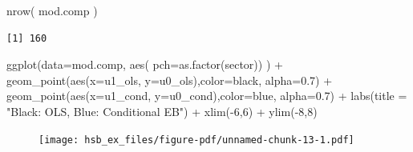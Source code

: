 \documentclass[
  letterpaper,
  DIV=11,
  numbers=noendperiod]{scrreprt}
\newenvironment{Shaded}{\begin{snugshade}}{\end{snugshade}}
\newcommand{\AttributeTok}[1]{\textcolor[rgb]{0.49,0.56,0.16}{#1}}
\newcommand{\DecValTok}[1]{\textcolor[rgb]{0.25,0.63,0.44}{#1}}
\newcommand{\FloatTok}[1]{\textcolor[rgb]{0.25,0.63,0.44}{#1}}
\newcommand{\FunctionTok}[1]{\textcolor[rgb]{0.02,0.16,0.49}{#1}}
\newcommand{\NormalTok}[1]{\textcolor[rgb]{0.00,0.44,0.13}{#1}}
\newcommand{\SpecialCharTok}[1]{\textcolor[rgb]{0.25,0.44,0.63}{#1}}
\newcommand{\StringTok}[1]{\textcolor[rgb]{0.25,0.44,0.63}{#1}}
\begin{document}
\begin{Shaded}
\begin{Highlighting}[]
\FunctionTok{nrow}\NormalTok{( mod.comp )}
\end{Highlighting}
\end{Shaded}

\begin{verbatim}
[1] 160
\end{verbatim}

\begin{Shaded}
\begin{Highlighting}[]
\FunctionTok{ggplot}\NormalTok{(}\AttributeTok{data=}\NormalTok{mod.comp, }\FunctionTok{aes}\NormalTok{( }\AttributeTok{pch=}\FunctionTok{as.factor}\NormalTok{(sector)) ) }\SpecialCharTok{+} 
         \FunctionTok{geom\_point}\NormalTok{(}\FunctionTok{aes}\NormalTok{(}\AttributeTok{x=}\NormalTok{u1\_ols, }\AttributeTok{y=}\NormalTok{u0\_ols),}\AttributeTok{color=}\StringTok{\textquotesingle{}black\textquotesingle{}}\NormalTok{, }\AttributeTok{alpha=}\FloatTok{0.7}\NormalTok{) }\SpecialCharTok{+}   
         \FunctionTok{geom\_point}\NormalTok{(}\FunctionTok{aes}\NormalTok{(}\AttributeTok{x=}\NormalTok{u1\_cond, }\AttributeTok{y=}\NormalTok{u0\_cond),}\AttributeTok{color=}\StringTok{\textquotesingle{}blue\textquotesingle{}}\NormalTok{, }\AttributeTok{alpha=}\FloatTok{0.7}\NormalTok{) }\SpecialCharTok{+} 
         \FunctionTok{labs}\NormalTok{(}\AttributeTok{title =} \StringTok{"Black: OLS, Blue: Conditional EB"}\NormalTok{) }\SpecialCharTok{+} 
         \FunctionTok{xlim}\NormalTok{(}\SpecialCharTok{{-}}\DecValTok{6}\NormalTok{,}\DecValTok{6}\NormalTok{) }\SpecialCharTok{+} \FunctionTok{ylim}\NormalTok{(}\SpecialCharTok{{-}}\DecValTok{8}\NormalTok{,}\DecValTok{8}\NormalTok{)}
\end{Highlighting}
\end{Shaded}

\begin{figure}[H]

{\centering \texttt{[image: hsb\_ex\_files/figure-pdf/unnamed-chunk-13-1.pdf]}

}

\end{figure}
\end{document}

